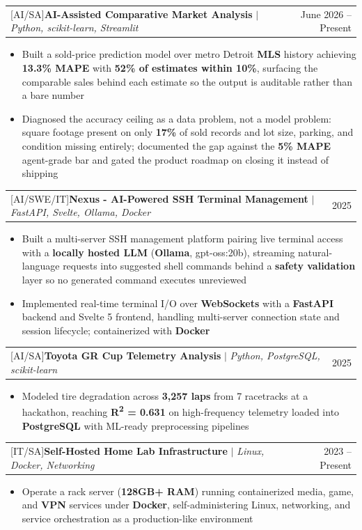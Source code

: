 \documentclass[letterpaper,11pt]{article}
\makeatletter
\newcommand{\resumeItem}[1]{
  \item\small{
    {#1 \vspace{-2pt}}
  }
}
\newcommand{\resumeProjectHeading}[2]{
    \item
    \begin{tabular*}{0.97\textwidth}{l@{\extracolsep{\fill}}r}
      \small#1 & #2 \\
    \end{tabular*}\vspace{-7pt}
}
\newcommand{\resumeItemListStart}{\begin{itemize}}
\newcommand{\resumeItemListEnd}{\end{itemize}\vspace{-5pt}}
\newcommand{\track}[1]{{\footnotesize\color{Gray}[#1]}\;}
\makeatother
\begin{document}
      \resumeProjectHeading
          {\track{AI/SA}\textbf{AI-Assisted Comparative Market Analysis} $|$ \emph{Python, scikit-learn, Streamlit}}{June 2026 -- Present}
          \resumeItemListStart
            \resumeItem{Built a sold-price prediction model over metro Detroit \textbf{MLS} history achieving \textbf{13.3\% MAPE} with \textbf{52\% of estimates within 10\%}, surfacing the comparable sales behind each estimate so the output is auditable rather than a bare number}
            \resumeItem{Diagnosed the accuracy ceiling as a data problem, not a model problem: square footage present on only \textbf{17\%} of sold records and lot size, parking, and condition missing entirely; documented the gap against the \textbf{5\% MAPE} agent-grade bar and gated the product roadmap on closing it instead of shipping}
          \resumeItemListEnd

      \resumeProjectHeading
          {\track{AI/SWE/IT}\textbf{Nexus - AI-Powered SSH Terminal Management} $|$ \emph{FastAPI, Svelte, Ollama, Docker}}{2025}
          \resumeItemListStart
            \resumeItem{Built a multi-server SSH management platform pairing live terminal access with a \textbf{locally hosted LLM} (\textbf{Ollama}, gpt-oss:20b), streaming natural-language requests into suggested shell commands behind a \textbf{safety validation} layer so no generated command executes unreviewed}
            \resumeItem{Implemented real-time terminal I/O over \textbf{WebSockets} with a \textbf{FastAPI} backend and Svelte 5 frontend, handling multi-server connection state and session lifecycle; containerized with \textbf{Docker}}
          \resumeItemListEnd

      \resumeProjectHeading
          {\track{AI/SA}\textbf{Toyota GR Cup Telemetry Analysis} $|$ \emph{Python, PostgreSQL, scikit-learn}}{2025}
          \resumeItemListStart
            \resumeItem{Modeled tire degradation across \textbf{3,257 laps} from 7 racetracks at a hackathon, reaching \textbf{R\textsuperscript{2} = 0.631} on high-frequency telemetry loaded into \textbf{PostgreSQL} with ML-ready preprocessing pipelines}
          \resumeItemListEnd

      \resumeProjectHeading
          {\track{IT/SA}\textbf{Self-Hosted Home Lab Infrastructure} $|$ \emph{Linux, Docker, Networking}}{2023 -- Present}
          \resumeItemListStart
            \resumeItem{Operate a rack server (\textbf{128GB+ RAM}) running containerized media, game, and \textbf{VPN} services under \textbf{Docker}, self-administering Linux, networking, and service orchestration as a production-like environment}
          \resumeItemListEnd
\end{document}
